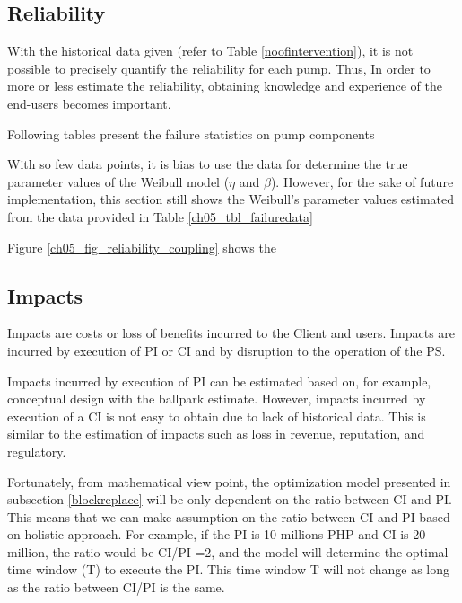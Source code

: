 \subsection{Reliability}
With the historical data given (refer to Table \ref{noofintervention}), it is not possible to precisely quantify the reliability for each pump. Thus, In order to more or less estimate the reliability, obtaining knowledge and experience of the end-users becomes important.

Following tables present the failure statistics on pump components




With so few data points, it is bias to use the data for determine the true parameter values of the Weibull model ($\eta$ and $\beta$). However, for the sake of future implementation, this section still shows the Weibull's parameter values estimated from the data provided in Table \ref{ch05_tbl_failuredata}

Figure \ref{ch05_fig_reliability_coupling} shows the














\subsection{Impacts}
Impacts are costs or loss of benefits incurred to the Client and users. Impacts are incurred by execution of PI or CI and by disruption to the operation of the PS.

Impacts incurred by execution of PI can be estimated based on, for example, conceptual design with the ballpark estimate. However, impacts incurred by execution of a CI is not easy to obtain due to lack of historical data. This is similar to the estimation of impacts such as loss in revenue, reputation, and regulatory.

Fortunately, from mathematical view point, the optimization model presented in subsection \ref{blockreplace} will be only dependent on the ratio between CI and PI. This means that we can make assumption on the ratio between CI and PI based on holistic approach. For example, if the PI is 10 millions PHP and CI is 20 million, the ratio would be CI/PI =2, and the model will determine the optimal time window (T) to execute the PI. This time window T will not change as long as the ratio between CI/PI is the same.

